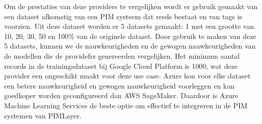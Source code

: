 Om de prestaties van deze providers te vergelijken wordt er gebruik gemaakt van een dataset afkomstig van een PIM systeem dat reeds bestaat en van tags is voorzien. Uit deze dataset worden er 5 datasets gemaakt: 1 met een grootte van 10, 20, 30, 50 en 100\% van de originele dataset. Door gebruik te maken van deze 5 datasets, kunnen we de nauwkeurigheden en de gewogen nauwkeurigheden van de modellen die de providefrs genereerden vergelijken. Het minimum aantal records in de trainingsdataset bij Google Cloud Platform is 1000, wat deze provider een ongeschikt maakt voor deze use case. Azure kon voor elke dataset een betere nauwkeurigheid en gewogen nauwkeurigheid voorleggen en kan goedkoper worden geconfigureerd dan AWS SageMaker. Daardoor is Azure Machine Learning Services de beste optie om effectief te integreren in de PIM systemen van PIMLayer.  
